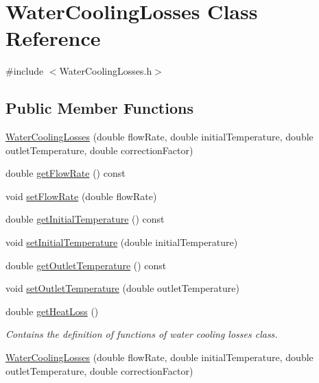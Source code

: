 \hypertarget{class_water_cooling_losses}{}\section{Water\+Cooling\+Losses Class Reference}
\label{class_water_cooling_losses}


{\ttfamily \#include $<$Water\+Cooling\+Losses.\+h$>$}

\subsection*{Public Member Functions}
\begin{DoxyCompactItemize}
\item 
\hyperlink{class_water_cooling_losses_ac95601d8c56e7243ffa3e022819a112f}{Water\+Cooling\+Losses} (double flow\+Rate, double initial\+Temperature, double outlet\+Temperature, double correction\+Factor)
\item 
double \hyperlink{class_water_cooling_losses_a47f1b7d46f0e34ae898150a7c69e5f18}{get\+Flow\+Rate} () const
\item 
void \hyperlink{class_water_cooling_losses_abf4d64d9261818af331613791374d42f}{set\+Flow\+Rate} (double flow\+Rate)
\item 
double \hyperlink{class_water_cooling_losses_a205b469029ec9cd4d792169bf8589f24}{get\+Initial\+Temperature} () const
\item 
void \hyperlink{class_water_cooling_losses_a56b0b64b71ecbece780622d5f4b536ba}{set\+Initial\+Temperature} (double initial\+Temperature)
\item 
double \hyperlink{class_water_cooling_losses_a79fb78755e813b2a3aa36ccd8ccebf7a}{get\+Outlet\+Temperature} () const
\item 
void \hyperlink{class_water_cooling_losses_a36bb100df0580a78f63f266cdc1d41f5}{set\+Outlet\+Temperature} (double outlet\+Temperature)
\item 
double \hyperlink{class_water_cooling_losses_a8f884cc70d7af7add5bb1be7f837384c}{get\+Heat\+Loss} ()
\begin{DoxyCompactList}\small\item\em Contains the definition of functions of water cooling losses class. \end{DoxyCompactList}\item 
\hyperlink{class_water_cooling_losses_ac95601d8c56e7243ffa3e022819a112f}{Water\+Cooling\+Losses} (double flow\+Rate, double initial\+Temperature, double outlet\+Temperature, double correction\+Factor)

\end{DoxyCompactItemize}
